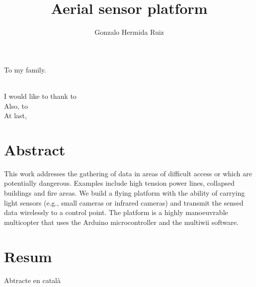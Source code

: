 \documentclass[12pt, a4paper,twoside]{tesi_upf}
\title{Aerial sensor platform}
\author{Gonzalo Hermida Ruiz}
\begin{document}
\frontmatter

\maketitle

\cleardoublepage


\noindent To my family.

\cleardoublepage


\\[12pt] 
        
I would like to thank to 
\\[8pt]

Also, to 
\\[8pt]

At last, 

\cleardoublepage


\section*{\Large \sffamily Abstract}

This  work  addresses  the  gathering  of  data  in  areas  of  difficult  access  or  which  are potentially dangerous. Examples include high tension power lines, collapsed buildings and fire areas. We build a flying platform with the ability of carrying light sensors (e.g., small cameras or infrared cameras) and transmit the sensed data wirelessly to a control point. The platform is a highly manoeuvrable multicopter that uses the Arduino microcontroller and the multiwii software.

\vspace*{\fill}
\section*{\Large \sffamily  Resum}

Abtracte en català

\vspace*{\fill}
\end{document}
